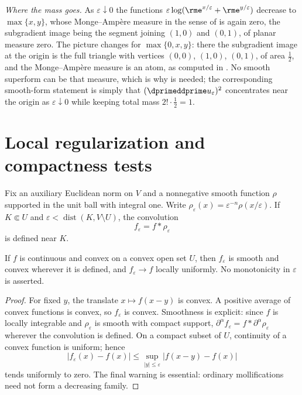 \begin{example}
\emph{Where the mass goes.}  As $\varepsilon\downarrow0$ the functions
$\varepsilon\log(\rme^{x/\varepsilon}+\rme^{y/\varepsilon})$ decrease to
$\max\{x,y\}$, whose Monge--Amp\`ere measure in the sense of
 is again zero, the subgradient image
being the segment joining $(1,0)$ and $(0,1)$, of planar measure zero.  The
picture changes for $\max\{0,x,y\}$: there the subgradient image at the
origin is the full triangle with vertices $(0,0)$, $(1,0)$, $(0,1)$, of area
$\tfrac12$, and the Monge--Amp\`ere measure is an atom, as computed in
.  No smooth superform can be that measure,
which is why  is needed; the corresponding
smooth-form statement is simply that
$(\dprimeddprime u_\varepsilon)^2$ concentrates near the origin as
$\varepsilon\downarrow0$ while keeping total mass $2!\cdot\tfrac12=1$.
\end{example}

\section{Local regularization and compactness tests}
\label{sec:ch09-regularization}

Fix an auxiliary Euclidean norm on $V$ and a nonnegative smooth function
$\rho$ supported in the unit ball with integral one.  Write
$\rho_\varepsilon(x)=\varepsilon^{-n}\rho(x/\varepsilon)$.  If
$K\Subset U$ and $\varepsilon<\operatorname{dist}(K,V\setminus U)$, the
convolution
\[
                       f_\varepsilon=f*\rho_\varepsilon
\]
is defined near $K$.

\begin{proposition}
\label{prop:superform-convex-mollification}
If $f$ is continuous and convex on a convex open set $U$, then
$f_\varepsilon$ is smooth and convex wherever it is defined, and
$f_\varepsilon\to f$ locally uniformly.  No monotonicity in $\varepsilon$ is
asserted.
\end{proposition}
\begin{proof}
For fixed $y$, the translate $x\mapsto f(x-y)$ is convex.  A positive average
of convex functions is convex, so $f_\varepsilon$ is convex.  Smoothness is
explicit: since $f$ is locally integrable and $\rho_\varepsilon$ is smooth
with compact support,
$\partial^\alpha f_\varepsilon=f*\partial^\alpha\rho_\varepsilon$ wherever
the convolution is defined.  On a compact subset of $U$, continuity of a
convex function is uniform; hence
\[
 |f_\varepsilon(x)-f(x)|
 \leq\sup_{|y|\leq\varepsilon}|f(x-y)-f(x)|
\]
tends uniformly to zero.  The final warning is essential: ordinary
mollifications need not form a decreasing family.
\end{proof}

